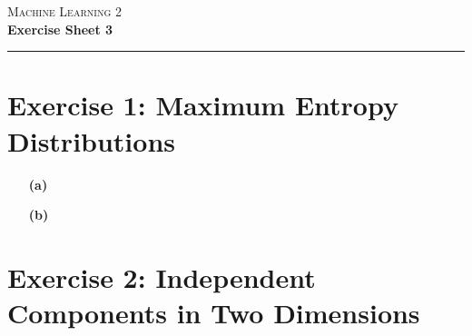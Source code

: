 \documentclass{article}
\begin{document}
\begin{center}
	\Huge \textsc{Machine Learning 2} \\
    \Large \textbf{Exercise Sheet 3}
\end{center}

\hrule

\section*{Exercise 1: Maximum Entropy Distributions} 
\begin{itemize}
\item[\textbf{(a)}]
\item[\textbf{(b)}]
\end{itemize}

\section*{Exercise 2: Independent Components in Two Dimensions} 
\end{document}
